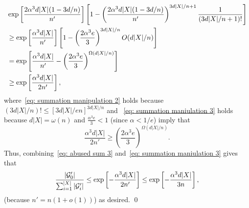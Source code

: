 \documentclass[11pt]{article}
\theoremstyle{plain}
\begin{document}
    \begin{align}
       &\exp\left[\frac{2\alpha^3d|X|(1 - 3d/n)}{n'}\right]\left[1 - \left(\frac{2\alpha^3d|X|(1 - 3d/n)}{n'}\right)^{3d|X|/n + 1}\frac{1}{(3d|X|/n + 1)!}\right]\notag\\
        &\geq \exp\left[\frac{\alpha^3d|X|}{n'}\right]\left[1 - \left(\frac{2\alpha^3e}{3}\right)^{3d|X|/n}O(d|X|/n)\right]\label{eq: summation manipulation 2}\\
        &= \exp\left[\frac{\alpha^3d|X|}{n'} - \left(\frac{2\alpha^3e}{3}\right)^{\Omega(d|X|/n)}\right]\notag\\
        &\geq \exp\left[ \frac{\alpha^3d|X|}{2n'}\right],\label{eq: summation maniulation 3}
    \end{align}
    where~\eqref{eq: summation manipulation 2} holds because $(3d|X|/n)! \leq \left[3d|X|/en\right]^{3d|X|/n}$ and ~\eqref{eq: summation maniulation 3} holds because $d|X|  = \omega(n)$ and $\frac{\alpha^3e}{3} < 1$ (since $\alpha < 1/e$) imply that 
    \[
    \frac{\alpha^3d|X|}{2n'} \geq \left(\frac{2\alpha^3e}{3}\right)^{\Omega(d|X|/n)}.
    \]
    Thus, combining~\eqref{eq: abused sum 3} and~\eqref{eq: summation maniulation 3} gives that 
    \begin{equation}\notag
        \frac{|\mathcal G'_0|}{\sum_{i = 1}^{|X|}|\mathcal G'_i|} \leq \exp\left[-\frac{\alpha^3d|X|}{2n'}\right] \leq \exp\left[-\frac{\alpha^3d|X|}{3n}\right],
    \end{equation}
    (because $n' = n(1 + o(1))$) as desired.
\qed
\smallskip 
\end{document}
